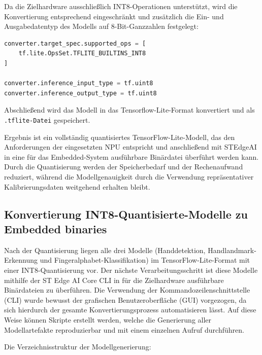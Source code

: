 Da die Zielhardware ausschließlich INT8-Operationen unterstützt, wird die Konvertierung entsprechend eingeschränkt und zusätzlich die Ein- und Ausgabedatentyp des Modells auf 8-Bit-Ganzzahlen festgelegt:
\begin{lstlisting}[language=python, caption={INT8-Quantisierung konfigurieren}, label={lst:tflite-int8}]
converter.target_spec.supported_ops = [
    tf.lite.OpsSet.TFLITE_BUILTINS_INT8
]

converter.inference_input_type = tf.uint8
converter.inference_output_type = tf.uint8
\end{lstlisting}

Abschließend wird das Modell in das Tensorflow-Lite-Format konvertiert und als \texttt{.tflite-Datei} gespeichert.

Ergebnis ist ein vollständig quantisiertes TensorFlow-Lite-Modell, das den Anforderungen der eingesetzten NPU entspricht und anschließend mit STEdgeAI in eine für das Embedded-System ausführbare Binärdatei überführt werden kann. Durch die Quantisierung werden der Speicherbedarf und der Rechenaufwand reduziert, während die Modellgenauigkeit durch die Verwendung repräsentativer Kalibrierungsdaten weitgehend erhalten bleibt.

\subsection{Konvertierung INT8-Quantisierte-Modelle zu Embedded binaries}

Nach der Quantisierung liegen alle drei Modelle (Handdetektion, Handlandmark-Erkennung und Fingeralphabet-Klassifikation) im TensorFlow-Lite-Format mit einer INT8-Quantisierung vor. Der nächste Verarbeitungsschritt ist diese Modelle mithilfe der ST Edge AI Core CLI in für die Zielhardware ausführbare Binärdateien zu überführen. Die Verwendung der Kommandozeilenschnittstelle (CLI) wurde bewusst der grafischen Benutzeroberfläche (GUI) vorgezogen, da sich hierdurch der gesamte Konvertierungsprozess automatisieren lässt. Auf diese Weise können Skripte erstellt werden, welche die Generierung aller Modellartefakte reproduzierbar und mit einem einzelnen Aufruf durchführen.

Die Verzeichnisstruktur der Modellgenerierung:

